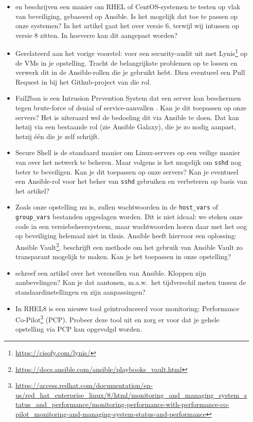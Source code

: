 \begin{itemize}
  \item \textcite{Hayden2015} en \textcite{Davila2015} beschrijven een manier om RHEL of CentOS-sys\-te\-men te testen op vlak van beveiliging, gebaseerd op Ansible. Is het mogelijk dat toe te passen op onze systemen? In het artikel gaat het over versie 6, terwijl wij intussen op versie 8 zitten. In hoeverre kan dit aangepast worden?
  \item Gerelateerd aan het vorige voorstel: voer een security-audit uit met Lynis\footnote{\url{https://cisofy.com/lynis/}} op de VMs in je opstelling. Tracht de belangrijkste problemen op te lossen en verwerk dit in de Ansible-rollen die je gebruikt hebt. Dien eventueel een Pull Request in bij het Github-project van die rol.
  \item Fail2ban is een Intrusion Prevention System dat een server kan beschermen tegen brute-force of denial of service-aanvallen \autocite{Sawiyati2014}. Kan je dit toepassen op onze servers? Het is uiteraard wel de bedoeling dit via Ansible te doen. Dat kan hetzij via een bestaande rol (zie Ansible Galaxy), die je zo nodig aanpast, hetzij één die je zelf schrijft.
  \item Secure Shell is de standaard manier om Linux-servers op een veilige manier van over het netwerk te beheren. Maar volgens \textcite{stribika2015} is het mogelijk om \texttt{sshd} nog beter te beveiligen. Kan je dit toepassen op onze servers? Kan je eventueel een Ansible-rol voor het beher van \texttt{sshd} gebruiken en verbeteren op basis van het artikel?
  \item Zoals onze opstelling nu is, zullen wachtwoorden in de \texttt{host\_vars} of \texttt{group\_vars} bestanden opgeslagen worden. Dit is niet ideaal: we steken onze code in een versiebeheersysteem, maar wachtwoorden horen daar met het oog op beveiliging helemaal niet in thuis. Ansible heeft hiervoor een oplossing: Ansible Vault\footnote{\url{https://docs.ansible.com/ansible/playbooks_vault.html}}. \textcite{Blanc2015} beschrijft een methode om het gebruik van Ansible Vault zo transparant mogelijk te maken. Kan je het toepassen in onze opstelling?
  \item \textcite{Johnson2015} schreef een artikel over het versnellen van Ansible. Kloppen zijn aanbevelingen? Kan je dat aantonen, m.a.w.\ het tijdverschil meten tussen de standaardinstellingen en zijn aanpassingen?
  \item In RHEL8 is een nieuwe tool geïntroduceerd voor monitoring: Performance Co-Pilot\footnote{\url{https://access.redhat.com/documentation/en-us/red_hat_enterprise_linux/8/html/monitoring_and_managing_system_status_and_performance/monitoring-performance-with-performance-co-pilot_monitoring-and-managing-system-status-and-performance}} (PCP). Probeer deze tool uit en zorg er voor dat je gehele opstelling via PCP kan opgevolgd worden.
\end{itemize}


